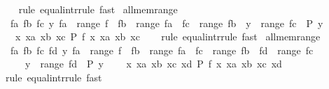 \begin{isabellebody}
%
\isadelimproof
\ \ %
\endisadelimproof
%
\isatagproof
{}\isamarkupfalse%
\ {\isacharparenleft}{\kern0pt}rule\ equal{\isacharunderscore}{\kern0pt}intr{\isacharunderscore}{\kern0pt}rule{\isacharparenright}{\kern0pt}\ fast{\isacharplus}{\kern0pt}%
\endisatagproof
{\isafoldproof}%
%
\isadelimproof
\isanewline
%
\endisadelimproof
\isanewline
{}\isamarkupfalse%
\ all{\isacharunderscore}{\kern0pt}mem{\isacharunderscore}{\kern0pt}range{}{\isacharcolon}{\kern0pt}\isanewline
\ \ {\isachardoublequoteopen}{\isacharparenleft}{\kern0pt}{\isasymAnd}fa\ fb\ fc\ y{\isachardot}{\kern0pt}\ fa\ {\isasymin}\ range\ f\ {\isasymLongrightarrow}\ fb\ {\isasymin}\ range\ fa\ {\isasymLongrightarrow}\ fc\ {\isasymin}\ range\ fb\ {\isasymLongrightarrow}\ y\ {\isasymin}\ range\ fc\ {\isasymLongrightarrow}\ P\ y{\isacharparenright}{\kern0pt}\ {\isasymequiv}\isanewline
\ \ \ {\isacharparenleft}{\kern0pt}{\isasymAnd}x\ xa\ xb\ xc{\isachardot}{\kern0pt}\ P\ {\isacharparenleft}{\kern0pt}f\ x\ xa\ xb\ xc{\isacharparenright}{\kern0pt}{\isacharparenright}{\kern0pt}{\isachardoublequoteclose}\isanewline
%
\isadelimproof
\ \ %
\endisadelimproof
%
\isatagproof
{}\isamarkupfalse%
\ {\isacharparenleft}{\kern0pt}rule\ equal{\isacharunderscore}{\kern0pt}intr{\isacharunderscore}{\kern0pt}rule{\isacharparenright}{\kern0pt}\ fast{\isacharplus}{\kern0pt}%
\endisatagproof
{\isafoldproof}%
%
\isadelimproof
\isanewline
%
\endisadelimproof
\isanewline
{}\isamarkupfalse%
\ all{\isacharunderscore}{\kern0pt}mem{\isacharunderscore}{\kern0pt}range{}{\isacharcolon}{\kern0pt}\isanewline
\ \ {\isachardoublequoteopen}{\isacharparenleft}{\kern0pt}{\isasymAnd}fa\ fb\ fc\ fd\ y{\isachardot}{\kern0pt}\ fa\ {\isasymin}\ range\ f\ {\isasymLongrightarrow}\ fb\ {\isasymin}\ range\ fa\ {\isasymLongrightarrow}\ fc\ {\isasymin}\ range\ fb\ {\isasymLongrightarrow}\ fd\ {\isasymin}\ range\ fc\ {\isasymLongrightarrow}\isanewline
\ \ \ \ \ y\ {\isasymin}\ range\ fd\ {\isasymLongrightarrow}\ P\ y{\isacharparenright}{\kern0pt}\ {\isasymequiv}\isanewline
\ \ \ {\isacharparenleft}{\kern0pt}{\isasymAnd}x\ xa\ xb\ xc\ xd{\isachardot}{\kern0pt}\ P\ {\isacharparenleft}{\kern0pt}f\ x\ xa\ xb\ xc\ xd{\isacharparenright}{\kern0pt}{\isacharparenright}{\kern0pt}{\isachardoublequoteclose}\isanewline
%
\isadelimproof
\ \ %
\endisadelimproof
%
\isatagproof
{}\isamarkupfalse%
\ {\isacharparenleft}{\kern0pt}rule\ equal{\isacharunderscore}{\kern0pt}intr{\isacharunderscore}{\kern0pt}rule{\isacharparenright}{\kern0pt}\ fast{\isacharplus}{\kern0pt}%
\endisatagproof

\end{isabellebody}
